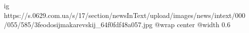  
 
 
 
 

\ifcmt
  ig https://s.0629.com.ua/s/17/section/newsInText/upload/images/news/intext/000/055/585/3feodosijmakarevskij_64f0fdf48a057.jpg
  @wrap center
  @width 0.6
\fi

